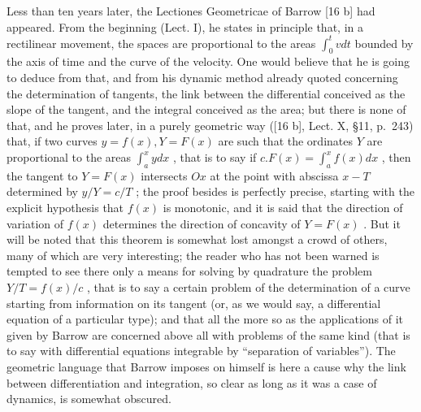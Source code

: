 Less than ten years later, the Lectiones Geometricae of Barrow {[}16 b{]} had appeared. From the beginning (Lect. I), he states in principle that, in a rectilinear movement, the spaces are proportional to the areas \(\int_{0}^{t} v dt\) bounded by the axis of time and the curve of the velocity. One would believe that he is going to deduce from that, and from his dynamic method already quoted concerning the determination of tangents, the link between the differential conceived as the slope of the tangent, and the integral conceived as the area; but there is none of that, and he proves later, in a purely geometric way ({[}16 b{]}, Lect. X, §11, p.~243) that, if two curves \(y = f(x), Y = F(x)\) are such that the ordinates \(Y\) are proportional to the areas \(\int_{a}^{x} y dx\) , that is to say if \(c.F(x) = \int_{a}^{x} f(x) dx\) , then the tangent to \(Y = F(x)\) intersects \(Ox\) at the point with abscissa \(x - T\) determined by \(y/Y = c/T\) ; the proof besides is perfectly precise, starting with the explicit hypothesis that \(f(x)\) is monotonic, and it is said that the direction of variation of \(f(x)\) determines the direction of concavity of \(Y = F(x)\) . But it will be noted that this theorem is somewhat lost amongst a crowd of others, many of which are very interesting; the reader who has not been warned is tempted to see there only a means for solving by quadrature the problem \(Y/T = f(x)/c\) , that is to say a certain problem of the determination of a curve starting from information on its tangent (or, as we would say, a differential equation of a particular type); and that all the more so as the applications of it given by Barrow are concerned above all with problems of the same kind (that is to say with differential equations integrable by ``separation of variables''). The geometric language that Barrow imposes on himself is here a cause why the link between differentiation and integration, so clear as long as it was a case of dynamics, is somewhat obscured.

